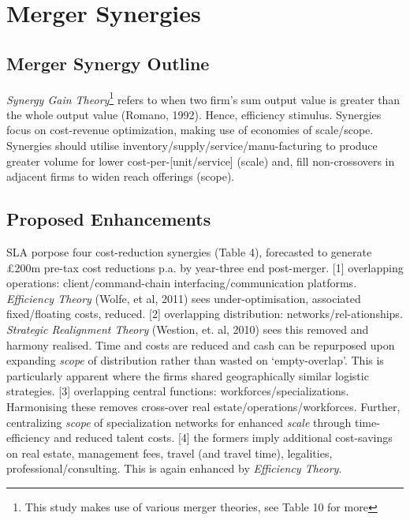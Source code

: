 \documentclass[11pt, english]{article}
\begin{document}
\newpage

\section{Merger Synergies}

	\subsection{Merger Synergy Outline}

\textit{Synergy Gain Theory}\footnote{This study makes use of various merger theories, see Table 10 for more} refers to when two firm's sum output value is greater than the whole output value (Romano, 1992). Hence, efficiency stimulus. Synergies focus on cost-revenue optimization, making use of economies of scale/scope. Synergies should utilise inventory/supply/service/manu-facturing to produce greater volume for lower cost-per-[unit/service] (scale) and, fill non-crossovers in adjacent firms to widen reach offerings (scope).

	\subsection{Proposed Enhancements}

SLA porpose four cost-reduction synergies (Table 4), forecasted to generate \pounds200m pre-tax cost reductions p.a. by year-three end post-merger. [1] overlapping operations: client/command-chain interfacing/communication platforms. \textit{Efficiency Theory} (Wolfe, et al, 2011) sees under-optimisation, associated fixed/floating costs, reduced. [2] overlapping distribution: networks/rel-ationships. \textit{Strategic Realignment Theory} (Westion, et. al, 2010) sees this removed and harmony realised. Time and costs are reduced and cash can be repurposed upon expanding \textit{scope} of distribution rather than wasted on `empty-overlap'. This is particularly apparent where the firms shared geographically similar logistic strategies. [3] overlapping central functions: workforces/specializations. Harmonising these removes cross-over real estate/operations/workforces. Further, centralizing \textit{scope} of specialization networks for enhanced \textit{scale} through time-efficiency and reduced talent costs. [4] the formers imply additional cost-savings on real estate, management fees, travel (and travel time), legalities, professional/consulting. This is again enhanced by \textit{Efficiency Theory}.\\
\end{document}
